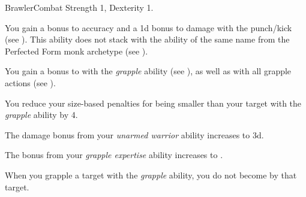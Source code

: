     \begin{feat}{Brawler}{Combat}
        \featpre Strength 1, Dexterity 1.

         You gain a  bonus to accuracy and a \plus1d bonus to damage with the punch/kick  (see ).
        This ability does not stack with the ability of the same name from the Perfected Form monk archetype (see ).

         You gain a  bonus to  with the \textit{grapple} ability (see ), as well as with all grapple actions (see ).

         You reduce your size-based penalties for being smaller than your target with the \textit{grapple} ability by 4.

         The damage bonus from your \textit{unarmed warrior} ability increases to \plus3d.

         The bonus from your \textit{grapple expertise} ability increases to .

         When you grapple a target with the \textit{grapple} ability, you do not become \grappled by that target.
    \end{feat}

